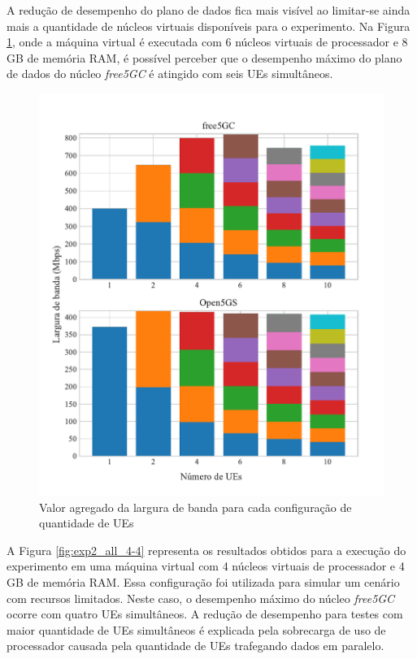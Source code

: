 A redução de desempenho do plano de dados fica mais visível ao limitar-se ainda mais a quantidade de núcleos virtuais disponíveis para o experimento.
Na Figura \ref{fig:exp2_all_6-8}, onde a máquina virtual é executada com 6 núcleos virtuais de processador e 8 GB de memória RAM, é possível perceber que o desempenho máximo do plano de dados do núcleo \textit{free5GC} é atingido com seis UEs simultâneos.

\begin{figure}[H]
    \centering
    \includegraphics[width=1\textwidth]{TG2/Chapters/DataAnalysis/Figures/EXP2-ALL-6C-8GB.pdf}
    \caption{Valor agregado da largura de banda para cada configuração de quantidade de UEs}
    \label{fig:exp2_all_6-8}
\end{figure}

A Figura \ref{fig:exp2_all_4-4} representa os resultados obtidos para a execução do experimento em uma máquina virtual com 4 núcleos virtuais de processador e 4 GB de memória RAM.
Essa configuração foi utilizada para simular um cenário com recursos limitados.
Neste caso, o desempenho máximo do núcleo \textit{free5GC} ocorre com quatro UEs simultâneos. 
A redução de desempenho para testes com maior quantidade de UEs simultâneos é explicada pela sobrecarga de uso de processador causada pela quantidade de UEs trafegando dados em paralelo.


